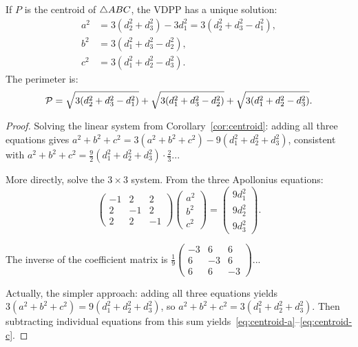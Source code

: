 \begin{theorem}
\label{thm:centroid-solution}
If $P$ is the centroid of $\triangle ABC$, the VDPP has a unique solution:
\begin{align}
a^2 &= 3(d_2^2 + d_3^2) - 3d_1^2 = 3(d_2^2 + d_3^2 - d_1^2), \label{eq:centroid-a}\\
b^2 &= 3(d_1^2 + d_3^2 - d_2^2), \label{eq:centroid-b}\\
c^2 &= 3(d_1^2 + d_2^2 - d_3^2). \label{eq:centroid-c}
\end{align}
The perimeter is:
\begin{equation}
\mathcal{P} = \sqrt{3(d_2^2 + d_3^2 - d_1^2)} + \sqrt{3(d_1^2 + d_3^2 - d_2^2)} + \sqrt{3(d_1^2 + d_2^2 - d_3^2)}.
\end{equation}
\end{theorem}

\begin{proof}
Solving the linear system from Corollary~\ref{cor:centroid}: adding all three equations gives $a^2 + b^2 + c^2 = 3(a^2 + b^2 + c^2) - 9(d_1^2 + d_2^2 + d_3^2)$, consistent with $a^2 + b^2 + c^2 = \frac{9}{2}(d_1^2 + d_2^2 + d_3^2) \cdot \frac{2}{3}$... 

More directly, solve the $3 \times 3$ system. From the three Apollonius equations:
\begin{equation}
\begin{pmatrix} -1 & 2 & 2 \\ 2 & -1 & 2 \\ 2 & 2 & -1 \end{pmatrix} \begin{pmatrix} a^2 \\ b^2 \\ c^2 \end{pmatrix} = \begin{pmatrix} 9d_1^2 \\ 9d_2^2 \\ 9d_3^2 \end{pmatrix}.
\end{equation}

The inverse of the coefficient matrix is $\frac{1}{9}\begin{pmatrix} -3 & 6 & 6 \\ 6 & -3 & 6 \\ 6 & 6 & -3 \end{pmatrix}$... 

Actually, the simpler approach: adding all three equations yields $3(a^2 + b^2 + c^2) = 9(d_1^2 + d_2^2 + d_3^2)$, so $a^2 + b^2 + c^2 = 3(d_1^2 + d_2^2 + d_3^2)$. Then subtracting individual equations from this sum yields~\eqref{eq:centroid-a}--\eqref{eq:centroid-c}.
\end{proof}

